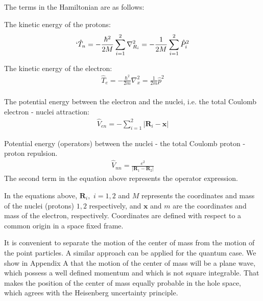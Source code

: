 The terms in the Hamiltonian are as follows:

The kinetic energy of the protons:
\begin{equation}`
\begin{split}
 \hat{T}_n = - \frac{\hbar^2}{2M}\sum_{i=1}^2{\nabla_{R_i}^2 } = -\frac{1}{2M}\sum_{i=1}^2{\hat{P}_i^2 }
\end{split}
\end{equation}

The kinetic energy of the electron:
\begin{equation}
\begin{split}
 \hat{T}_e= -\frac{\hbar^2}{2m}\nabla_{x}^2 = \frac{1}{2m}\hat{p}^2  \\[.8em]
\end{split}
\end{equation}

The potential energy between the electron and the nuclei, i.e. the total Coulomb electron - nuclei attraction:
\begin{equation}
\begin{split}
 \hat{V}_{en} = -\sum_{i=1}^2{\left|\mathbf{R}_i - \mathbf{x}\right| }   
\end{split}
\end{equation}

Potential energy (operators) between the nuclei - the total Coulomb proton - proton repulsion. 
\begin{equation}
\begin{split}
 \hat{V}_{nn} =  \frac{e^2}{\left|\mathbf{R}_1 - \mathbf{R}_2\right| } 
\end{split}
\end{equation}
The second term in the equation above represents the operator expression.

In the equations above, $ \mathbf{R}_i,\,\, i = 1,2 $ and $ M $ represents the coordinates and mass of the nuclei (protons) $1,2$ respectively, and $ \mathbf{x} $ and $ m $ are the coordinates and mass of the electron, respectively. Coordinates are defined with respect to a common origin in a space fixed frame.

It is convenient to separate the motion of the center of mass from the motion of the point particles. A similar approach can be applied for the quantum case. We show in Appendix A that the motion of the center of mass will be a plane wave, which possess a well defined momentum and which is not square integrable. That makes the position of the center of mass equally probable in the hole space, which agrees with the Heisenberg uncertainty principle.

